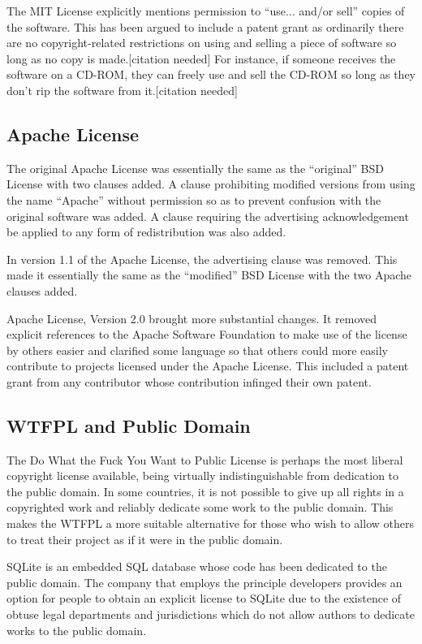\documentclass[12pt,letterpaper]{article}
\begin{document}
The MIT License explicitly mentions permission to ``use... and/or sell'' copies of the software. This has been argued to include a patent grant as ordinarily there are no copyright-related restrictions on using and selling a piece of software so long as no copy is made.[citation needed] For instance, if someone receives the software on a CD-ROM, they can freely use and sell the CD-ROM so long as they don't rip the software from it.[citation needed]

\subsection{Apache License}

The original Apache License was essentially the same as the ``original'' BSD License with two clauses added. A clause prohibiting modified versions from using the name ``Apache'' without permission so as to prevent confusion with the original software was added. A clause requiring the advertising acknowledgement be applied to any form of redistribution was also added.\cite{apache1}

In version 1.1 of the Apache License, the advertising clause was removed. This made it essentially the same as the ``modified'' BSD License with the two Apache clauses added.\cite{apache11}

Apache License, Version 2.0 brought more substantial changes. It removed explicit references to the Apache Software Foundation to make use of the license by others easier and clarified some language so that others could more easily contribute to projects licensed under the Apache License. This included a patent grant from any contributor whose contribution infinged their own patent.\cite{apache2}

\subsection{WTFPL and Public Domain}

The Do What the Fuck You Want to Public License is perhaps the most liberal copyright license available, being virtually indistinguishable from dedication to the public domain. In some countries, it is not possible to give up all rights in a copyrighted work and reliably dedicate some work to the public domain. This makes the WTFPL a more suitable alternative for those who wish to allow others to treat their project as if it were in the public domain.\cite{wtfpl}

SQLite is an embedded SQL database whose code has been dedicated to the public domain. The company that employs the principle developers provides an option for people to obtain an explicit license to SQLite due to the existence of obtuse legal departments and jurisdictions which do not allow authors to dedicate works to the public domain.\cite{sqlite}
\end{document}
